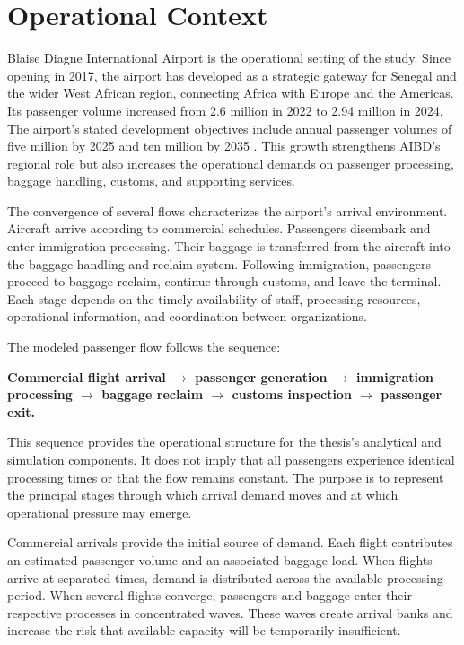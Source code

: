 \section{Operational Context}
\label{sec:operational-context}

Blaise Diagne International Airport is the operational setting of the study. Since opening in 2017, the airport has developed as a strategic gateway for Senegal and the wider West African region, connecting Africa with Europe and the Americas. Its passenger volume increased from 2.6 million in 2022 to 2.94 million in 2024. The airport's stated development objectives include annual passenger volumes of five million by 2025 and ten million by 2035 \parencite{demir2025speaker}. This growth strengthens AIBD's regional role but also increases the operational demands on passenger processing, baggage handling, customs, and supporting services.

The convergence of several flows characterizes the airport's arrival environment. Aircraft arrive according to commercial schedules. Passengers disembark and enter immigration processing. Their baggage is transferred from the aircraft into the baggage-handling and reclaim system. Following immigration, passengers proceed to baggage reclaim, continue through customs, and leave the terminal. Each stage depends on the timely availability of staff, processing resources, operational information, and coordination between organizations.

The modeled passenger flow follows the sequence:

\begin{center}
\textbf{Commercial flight arrival $\rightarrow$ passenger generation $\rightarrow$ immigration processing $\rightarrow$ baggage reclaim $\rightarrow$ customs inspection $\rightarrow$ passenger exit.}
\end{center}

This sequence provides the operational structure for the thesis's analytical and simulation components. It does not imply that all passengers experience identical processing times or that the flow remains constant. The purpose is to represent the principal stages through which arrival demand moves and at which operational pressure may emerge.

Commercial arrivals provide the initial source of demand. Each flight contributes an estimated passenger volume and an associated baggage load. When flights arrive at separated times, demand is distributed across the available processing period. When several flights converge, passengers and baggage enter their respective processes in concentrated waves. These waves create arrival banks and increase the risk that available capacity will be temporarily insufficient.

